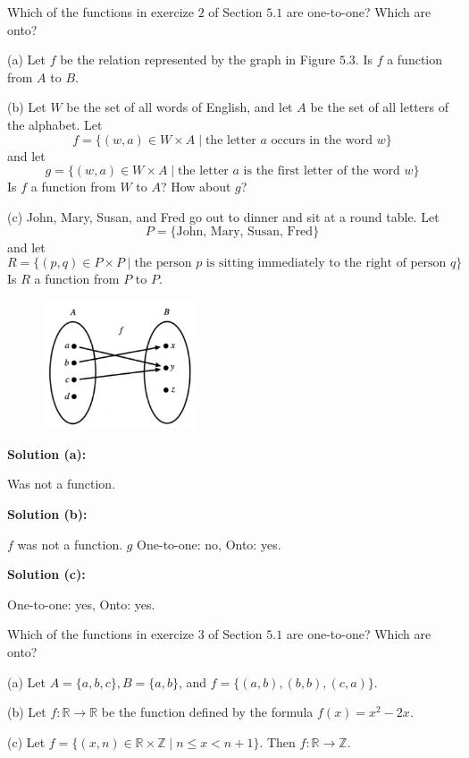 \begin{tcolorbox}[title=Problem 2, breakable]
    Which of the functions in exercize $2$ of Section $5.1$
        are one-to-one? Which are onto?

    (a) Let $f$ be the relation represented by the graph in Figure $5.3$.
        Is $f$ a function from $A$ to $B$.

    (b) Let $W$ be the set of all words of English, and let $A$ be the set 
        of all letters of the alphabet. 
        Let 
        \[f = \{(w, a) \in W \times A \mid \text{the letter $a$ occurs in the word $w$}\}\]
        and let 
        \[g = \{(w, a) \in W \times A \mid \text{the letter $a$ is the first letter of the word $w$}\}\]
        Is $f$ a function from $W$ to $A$?
        How about $g$?

    (c) John, Mary, Susan, and Fred go out to dinner and sit at a round table.
        Let 
        \[P = \{\text{John, Mary, Susan, Fred}\}\]
        and let 
        \[R = \{(p, q) \in P \times P \mid \text{the person $p$ is sitting immediately to the right of person $q$}\}\]
        Is $R$ a function from $P$ to $P$.
\end{tcolorbox}

\begin{figure}[h]
    \centering
    \includegraphics[width=0.4\textwidth]{images/func.png}
\end{figure}

\textbf{Solution (a):}
\begin{center}
    Was not a function.
\end{center}
\textbf{Solution (b):}
\begin{center}
    $f$ was not a function.
    $g$ One-to-one: no, Onto: yes.
\end{center}
\textbf{Solution (c):}
\begin{center}
    One-to-one: yes, Onto: yes.
\end{center}

\begin{tcolorbox}[title=Problem 3, breakable]
    Which of the functions in exercize $3$ of Section $5.1$
        are one-to-one? Which are onto?

    (a) Let $A = \{a, b, c\}, B = \{a, b\}$, and $f = \{(a, b), (b, b), (c, a)\}$.

    (b) Let $f : \mathbb{R} \rightarrow \mathbb{R}$ be the function defined by the
        formula $f(x) = x^2 - 2x$.

    (c) Let $f = \{(x, n) \in \mathbb{R} \times \mathbb{Z} \mid n \le x < n + 1\}$. 
        Then $f : \mathbb{R} \rightarrow \mathbb{Z}$.
\end{tcolorbox}

